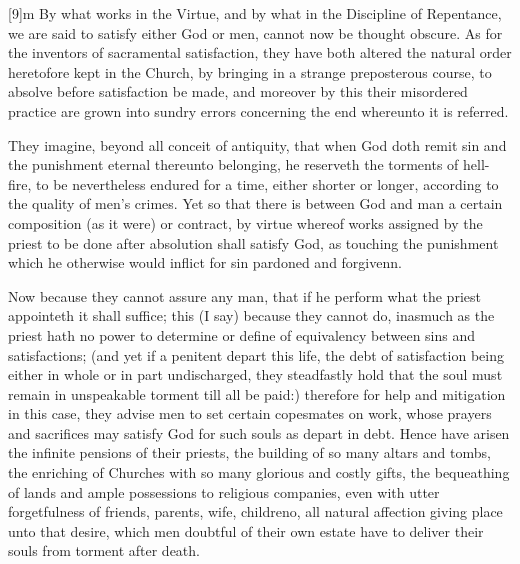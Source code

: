 [9]m By what works in the Virtue, and by what in the Discipline of Repentance, we are said to satisfy either God or men, cannot now be thought obscure.
As for the inventors of sacramental satisfaction, they have both altered the natural order heretofore kept in the Church, by bringing in a strange preposterous course, to absolve before satisfaction be made, and moreover by this their misordered practice are grown into sundry errors concerning the end whereunto it is referred.

They imagine, beyond all conceit of antiquity, that when God doth remit sin and the punishment eternal thereunto belonging, he reserveth the torments of hell-fire, to be nevertheless endured for a time, either shorter or longer, according to the quality of men’s crimes. Yet so that there is between God and man a certain composition (as it were) or contract, by virtue whereof works assigned by the priest to be done after absolution shall satisfy God, as touching the punishment which he otherwise would inflict for sin pardoned and forgivenn.

Now because they cannot assure any man, that if he perform what the priest appointeth it shall suffice; this (I say) because they cannot do, inasmuch as the priest hath no power to determine or define of equivalency between sins and satisfactions; (and yet if a penitent depart this life, the debt of satisfaction being either in whole or in part undischarged, they steadfastly hold that the soul must remain in unspeakable torment till all be paid:) therefore for help and mitigation in this case, they advise men to set certain copesmates on work, whose prayers and sacrifices may satisfy God for such souls  as depart in debt. Hence have arisen the infinite pensions of their priests, the building of so many altars and tombs, the enriching of Churches with so many glorious and costly gifts, the bequeathing of lands and ample possessions to religious companies, even with utter forgetfulness of friends, parents, wife, childreno, all natural affection giving place unto that desire, which men doubtful of their own estate have to deliver their souls from torment after death.

